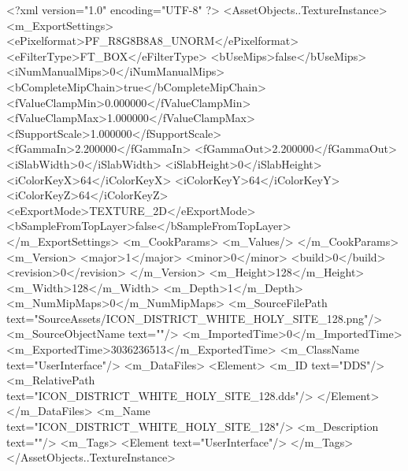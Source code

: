 <?xml version="1.0" encoding="UTF-8" ?>
<AssetObjects..TextureInstance>
	<m_ExportSettings>
		<ePixelformat>PF_R8G8B8A8_UNORM</ePixelformat>
		<eFilterType>FT_BOX</eFilterType>
		<bUseMips>false</bUseMips>
		<iNumManualMips>0</iNumManualMips>
		<bCompleteMipChain>true</bCompleteMipChain>
		<fValueClampMin>0.000000</fValueClampMin>
		<fValueClampMax>1.000000</fValueClampMax>
		<fSupportScale>1.000000</fSupportScale>
		<fGammaIn>2.200000</fGammaIn>
		<fGammaOut>2.200000</fGammaOut>
		<iSlabWidth>0</iSlabWidth>
		<iSlabHeight>0</iSlabHeight>
		<iColorKeyX>64</iColorKeyX>
		<iColorKeyY>64</iColorKeyY>
		<iColorKeyZ>64</iColorKeyZ>
		<eExportMode>TEXTURE_2D</eExportMode>
		<bSampleFromTopLayer>false</bSampleFromTopLayer>
	</m_ExportSettings>
	<m_CookParams>
		<m_Values/>
	</m_CookParams>
	<m_Version>
		<major>1</major>
		<minor>0</minor>
		<build>0</build>
		<revision>0</revision>
	</m_Version>
	<m_Height>128</m_Height>
	<m_Width>128</m_Width>
	<m_Depth>1</m_Depth>
	<m_NumMipMaps>0</m_NumMipMaps>
	<m_SourceFilePath text="SourceAssets/ICON_DISTRICT_WHITE_HOLY_SITE_128.png"/>
	<m_SourceObjectName text=""/>
	<m_ImportedTime>0</m_ImportedTime>
	<m_ExportedTime>3036236513</m_ExportedTime>
	<m_ClassName text="UserInterface"/>
	<m_DataFiles>
		<Element>
			<m_ID text="DDS"/>
			<m_RelativePath text="ICON_DISTRICT_WHITE_HOLY_SITE_128.dds"/>
		</Element>
	</m_DataFiles>
	<m_Name text="ICON_DISTRICT_WHITE_HOLY_SITE_128"/>
	<m_Description text=""/>
	<m_Tags>
		<Element text="UserInterface"/>
	</m_Tags>
</AssetObjects..TextureInstance>

